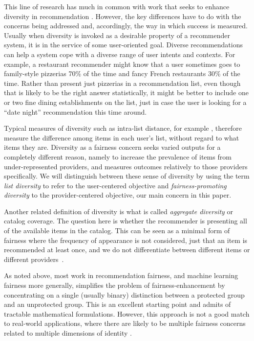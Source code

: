 This line of research has much in common with work that seeks to enhance diversity in recommendation \cite{zhang2008MonotonyDiv, vargas2011rankRelDiv, carbonell1998use, eskandanian2017clustering}. However, the key differences have to do with the concerns being addressed and, accordingly, the way in which success is measured. Usually when diversity is invoked as a desirable property of a recommender system, it is in the service of some user-oriented goal. Diverse recommendations can help a system cope with a diverse range of user intents and contexts. For example, a restaurant recommender might know that a user sometimes goes to family-style pizzerias 70\% of the time and fancy French restaurants 30\% of the time. Rather than present just pizzerias in a recommendation list, even though that is likely to be the right answer statistically, it might be better to include one or two fine dining establishments on the list, just in case the user is looking for a ``date night'' recommendation this time around. 

Typical measures of diversity such as intra-list distance, for example \cite{Ziegler:2005:IRL:1060745.1060754}, therefore measure the difference among items in each user's list, without regard to what items they are. Diversity as a fairness concern seeks varied outputs for a completely different reason, namely to increase the prevalence of items from under-represented providers, and measures outcomes relatively to those providers specifically. We will distinguish between these sense of diversity by using the term \textit{list diversity} to refer to the user-centered objective and \textit{fairness-promoting diversity} to the provider-centered objective, our main concern in this paper.

Another related definition of diversity is what is called \textit{aggregate diversity} or catalog coverage. The question here is whether the recommender is presenting all of the available items in the catalog. This can be seen as a minimal form of fairness where the frequency of appearance is not considered, just that an item is recommended at least once, and we do not differentiate between different items or different providers~\cite{adomavicius2011improving}.

As noted above, most work in recommendation fairness, and machine learning fairness more generally, simplifies the problem of fairness-enhancement by concentrating on a single (usually binary) distinction between a protected group and an unprotected group. This is an excellent starting point and admits of tractable mathematical formulations. However, this approach is not a good match to real-world applications, where there are likely to be multiple fairness concerns related to multiple dimensions of identity \cite{kearns2019empirical}.

